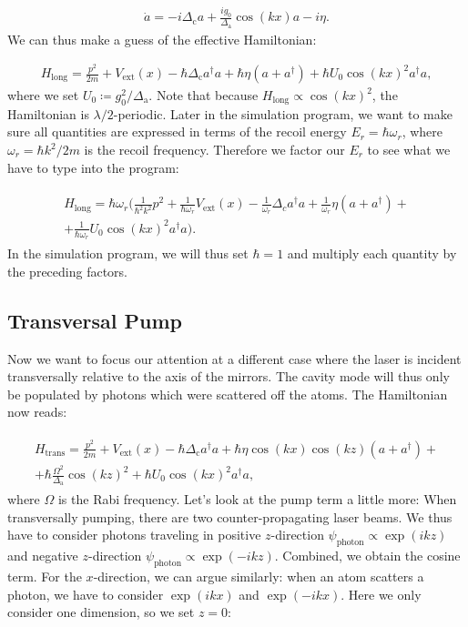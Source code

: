 \begin{align}
\dot{a} = -i \Delta_\text{c} a + \frac{i g_0}{\Delta_\text{a}}  \cos(kx) a - i \eta.
\end{align}We can thus make a guess of the effective Hamiltonian:

\begin{align}
H_\text{long} = \frac{p^2}{2m} + V_\text{ext}(x) - \hbar \Delta_\text{c} a^\dagger a + \hbar \eta (a + a^\dagger) + \hbar U_0 \cos(kx)^2 a^\dagger a,
\end{align}where we set $U_0 \coloneqq g_0^2 / \Delta_\text{a}$. Note that because $H_\text{long} \propto \cos(kx)^2$, the Hamiltonian is $\lambda / 2$-periodic. Later in the simulation program, we want to make sure all quantities are expressed in terms of the recoil energy $E_r = \hbar \omega_r$, where $\omega_r = \hbar k^2 / 2m$ is the recoil frequency. Therefore we factor our $E_r$ to see what we have to type into the program:

\begin{align}
\begin{split}
H_\text{long} = \hbar \omega_r \biggl( \frac{1}{\hbar^2 k^2} p^2 + \frac{1}{\hbar \omega_r} V_\text{ext}(x) - \frac{1}{\omega_r} \Delta_c a^\dagger a + \frac{1}{\omega_r} \eta (a + a^\dagger) + \\
 + \frac{1}{\hbar \omega_r} U_0 \cos(kx)^2 a^\dagger a \biggr).
\end{split}
\end{align}In the simulation program, we will thus set $\hbar = 1$ and multiply each quantity by the preceding factors.

\subsection{Transversal Pump}

Now we want to focus our attention at a different case where the laser is incident transversally relative to the axis of the mirrors. The cavity mode will thus only be populated by photons which were scattered off the atoms. The Hamiltonian now reads:

\begin{align}
\begin{split}
H_\text{trans} = \frac{p^2}{2m} + V_\text{ext}(x) - \hbar \Delta_\text{c} a^\dagger a  + \hbar \eta \cos(kx) \cos(kz) (a + a^\dagger) + \\
+ \hbar \frac{\Omega^2}{\Delta_\text{a}} \cos(kz)^2 + \hbar U_0 \cos(kx)^2 a^\dagger a,
\end{split}
\end{align}where $\Omega$ is the Rabi frequency. Let's look at the pump term a little more: When transversally pumping, there are two counter-propagating laser beams. We thus have to consider photons traveling in positive $z$-direction $\psi_\text{photon} \propto \exp(ikz)$ and negative $z$-direction $\psi_\text{photon} \propto \exp(-ikz)$. Combined, we obtain the cosine term. For the $x$-direction, we can argue similarly: when an atom scatters a photon, we have to consider $\exp(ikx)$ and $\exp(-ikx)$. Here we only consider one dimension, so we set $z=0$:

